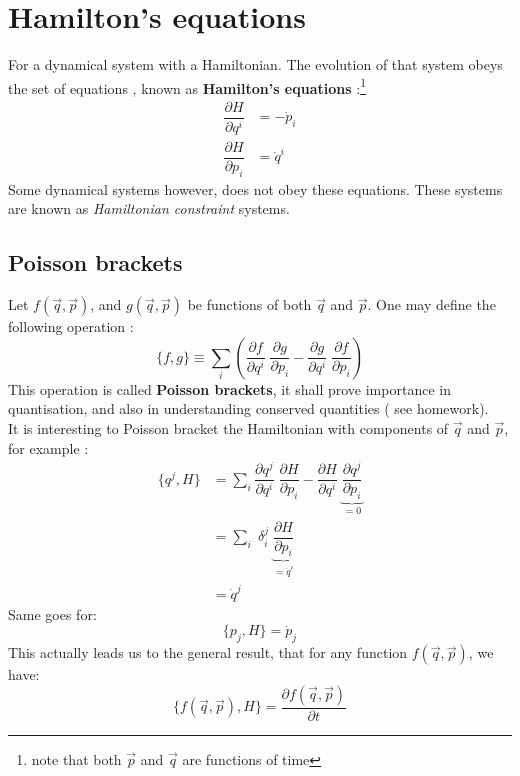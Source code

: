     \section{Hamilton's equations}
   For a dynamical system with a Hamiltonian. The evolution of that system obeys the set of equations , known as \textbf{Hamilton's equations }:\footnote{ note that both $\vec{p}$ and $ \vec{q}$ are functions of time}
   \begin{align}
   \dfrac{\partial H}{\partial q^i} &= - \dot{p}_i \\
    \dfrac{\partial H}{\partial p_i} &=  \dot{q}^i 
   \end{align}
    Some dynamical systems however, does not obey these equations. These systems are known as\textit{ Hamiltonian constraint} systems.
    \subsection{ Poisson brackets}
    Let $f(\vec{q}, \vec{p})$, and $g(\vec{q}, \vec{p})$ be functions of both $\vec{q}$ and $\vec{p}$. One may define the following operation :
    \begin{equation}
    \{f,g\} \equiv \sum_i \left( \dfrac{\partial f}{\partial q^ i}\; \dfrac{\partial g}{\partial p_ i}-\dfrac{\partial g}{\partial q^ i}\; \dfrac{\partial f}{\partial p_ i}\right) 
    \end{equation}
    This operation is called \textbf{Poisson brackets}, it shall prove importance in quantisation, and also in understanding conserved quantities ( see homework). \\ It is interesting to Poisson bracket the Hamiltonian with components of $\vec{q}$ and $\vec{p}$, for example :
    \begin{align}
    \{q^j , H \} &= \sum_i  \dfrac{\partial q^ j}{\partial q^ i}\; \dfrac{\partial H}{\partial p_ i}-\dfrac{\partial H}{\partial q^ i}\;\underbrace{ \dfrac{\partial q^j}{\partial p_ i}}_{=0} \nonumber \\
    &= \sum_i \;  \delta^j_i \; \underbrace{\dfrac{\partial H}{\partial p_ i}}_{= \dot{q}^i} \nonumber\\
    &= \dot{q}^j
    \end{align} 
    Same goes for:
    \begin{equation}
    \{p_j, H\} =\dot{p}_j
    \end{equation}
    This actually leads us to the general result,  that for any function  $f(\vec{q}, \vec{p})$, we have:
     \begin{equation}
     \{f(\vec{q}, \vec{p}), H\} =\dfrac{\partial f(\vec{q}, \vec{p})}{\partial t}
     \end{equation}
